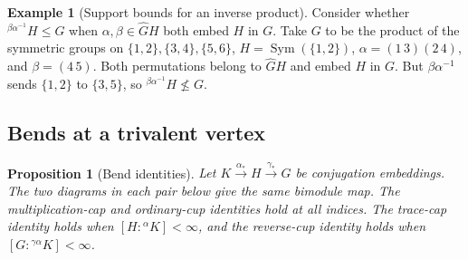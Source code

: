 \documentclass[11pt,a4paper]{article}
\numberwithin{equation}{section}
\newtheorem{proposition}[theorem]{Proposition}
\theoremstyle{definition}
\newtheorem{example}{Example}[section]
\newcommand{\cg}[2]{{}^{#1}\!#2}
\begin{document}
\begin{example}[Support bounds for an inverse product]\label{ex:support-inverse-product}
Consider whether \(\cg{\beta\alpha^{-1}}{H}\le G\)
when \(\alpha,\beta\in\widehat G H\) both embed \(H\) in \(G\). Take \(G\) to be the product of the symmetric groups on
\(\{1,2\},\{3,4\},\{5,6\}\), \(H=\operatorname{Sym}(\{1,2\})\),
\(\alpha=(1\,3)(2\,4)\), and \(\beta=(4\,5)\).
Both permutations belong to \(\widehat G H\) and embed \(H\) in \(G\).
But \(\beta\alpha^{-1}\) sends \(\{1,2\}\) to \(\{3,5\}\), so
\(\cg{\beta\alpha^{-1}}{H}\nleq G\).
\end{example}


\subsection{Bends at a trivalent vertex}
\begin{proposition}[Bend identities]\label{prop:trivalent-bends}
Let \(K\xrightarrow{\alpha_*}H\xrightarrow{\gamma_*}G\)
be conjugation embeddings. The two diagrams in each pair below
give the same bimodule map. The multiplication-cap and ordinary-cup
identities hold at all indices. The trace-cap identity holds when
\([H:\cg{\alpha}{K}]<\infty\), and the reverse-cup identity holds when
\([G:\cg{\gamma\alpha}{K}]<\infty\).
\end{proposition}
\end{document}
